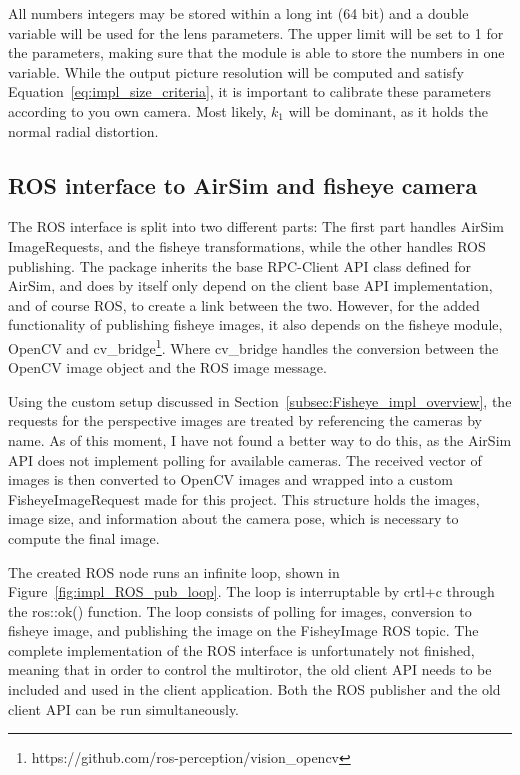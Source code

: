 All numbers integers may be stored within a long int (64 bit) and a double variable will be used for the lens parameters. The upper limit will be set to 1 for the parameters, making sure that the module is able to store the numbers in one variable. While the output picture resolution will be computed and satisfy Equation~\eqref{eq:impl_size_criteria}, it is important to calibrate these parameters according to you own camera. Most likely, $k_1$ will be dominant, as it holds the normal radial distortion.

\subsection{ROS interface to AirSim and fisheye camera}\label{subsec:ROS_interface}

The ROS interface is split into two different parts: The first part handles AirSim ImageRequests, and the fisheye transformations, while the other handles ROS publishing. The package inherits the base RPC-Client API class defined for AirSim, and does by itself only depend on the client base API implementation, and of course ROS, to create a link between the two. However, for the added functionality of publishing fisheye images, it also depends on the fisheye module, OpenCV and cv\_bridge\footnote{https://github.com/ros-perception/vision\_opencv}. Where cv\_bridge handles the conversion between the OpenCV image object and the ROS image message.

Using the custom setup discussed in Section~\ref{subsec:Fisheye_impl_overview}, the requests for the perspective images are treated by referencing the cameras by name. As of this moment, I have not found a better way to do this, as the AirSim API does not implement polling for available cameras. The received vector of images is then converted to OpenCV images and wrapped into a custom FisheyeImageRequest made for this project. This structure holds the images, image size, and information about the camera pose, which is necessary to compute the final image.

The created ROS node runs an infinite loop, shown in Figure~\ref{fig:impl_ROS_pub_loop}. The loop is interruptable by crtl+c through the ros::ok() function. The loop consists of polling for images, conversion to fisheye image, and publishing the image on the FisheyImage ROS topic. The complete implementation of the ROS interface is unfortunately not finished, meaning that in order to control the multirotor, the old client API needs to be included and used in the client application. Both the ROS publisher and the old client API can be run simultaneously.

